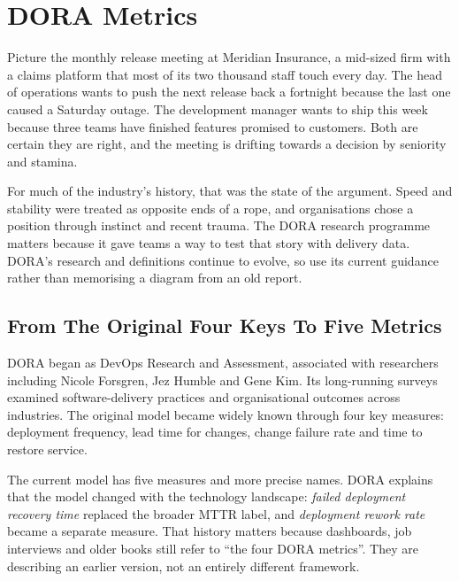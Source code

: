 \section{DORA Metrics}
Picture the monthly release meeting at Meridian Insurance, a mid-sized firm with a claims platform that most of its two thousand staff touch every day. The head of operations wants to push the next release back a fortnight because the last one caused a Saturday outage. The development manager wants to ship this week because three teams have finished features promised to customers. Both are certain they are right, and the meeting is drifting towards a decision by seniority and stamina.


For much of the industry's history, that was the state of the argument. Speed and stability were treated as opposite ends of a rope, and organisations chose a position through instinct and recent trauma. The DORA research programme matters because it gave teams a way to test that story with delivery data. DORA's research and definitions continue to evolve, so use its current guidance rather than memorising a diagram from an old report. \autocite{dora-research,dora-metrics}



\subsection{From The Original Four Keys To Five Metrics}


DORA began as DevOps Research and Assessment, associated with researchers including Nicole Forsgren, Jez Humble and Gene Kim. Its long-running surveys examined software-delivery practices and organisational outcomes across industries. The original model became widely known through four key measures: deployment frequency, lead time for changes, change failure rate and time to restore service.


The current model has five measures and more precise names. DORA explains that the model changed with the technology landscape: \emph{failed deployment recovery time} replaced the broader MTTR label, and \emph{deployment rework rate} became a separate measure. That history matters because dashboards, job interviews and older books still refer to ``the four DORA metrics''. They are describing an earlier version, not an entirely different framework. \autocite{dora-metrics}


